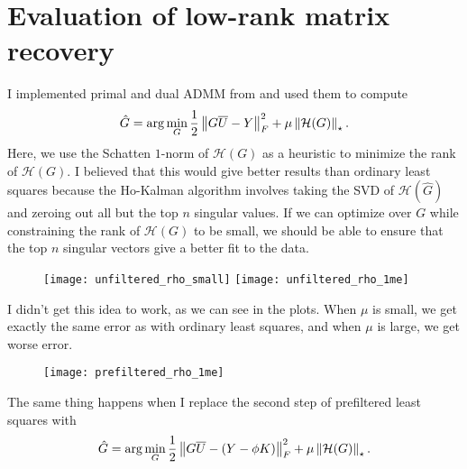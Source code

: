 \section{Evaluation of low-rank matrix recovery}

I implemented primal and dual ADMM from \cite{fazel2013hankel}
and used them to compute
\[ \hat G = \arg\min_G \frac{1}{2} \left\Vert{G \overline{U} - Y}\right\Vert_F^2 + \mu \left\Vert{\mathcal{H}(G)}\right\Vert_\star. \]
Here, we use the Schatten $1$-norm of $\mathcal{H}(G)$
as a heuristic to minimize the rank of $\mathcal{H}(G)$.
I believed that this would give better results
than ordinary least squares because the Ho-Kalman algorithm
involves taking the SVD of $\mathcal{H}(\hat G)$ and
zeroing out all but the top $n$ singular values.
If we can optimize over $G$ while constraining the rank
of $\mathcal{H}(G)$ to be small,
we should be able to ensure that the top $n$ singular vectors
give a better fit to the data.

\begin{figure}
\texttt{[image: unfiltered\_rho\_small]}
\texttt{[image: unfiltered\_rho\_1me]}
\end{figure}
I didn't get this idea to work, as we can see in the plots.
When $\mu$ is small, we get exactly the same error as with ordinary least squares,
and when $\mu$ is large, we get worse error.

\begin{figure}
\texttt{[image: prefiltered\_rho\_1me]}
\end{figure}
The same thing happens when I replace the second step
of prefiltered least squares with
\[ \hat G = \arg\min_G \frac{1}{2} \left\Vert{G \overline{U} - (Y - \phi K)}\right\Vert_F^2 + \mu \left\Vert{\mathcal{H}(G)}\right\Vert_\star. \]
